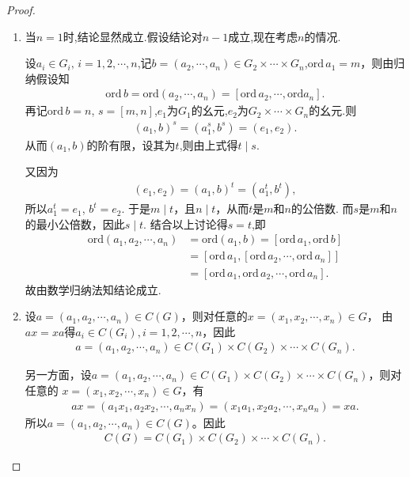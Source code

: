 \documentclass[../../main.tex]{subfiles}%
\begin{document}
\begin{proof}
\begin{enumerate}[(1)]
\item 当$n=1$时,结论显然成立.假设结论对$n-1$成立,现在考虑$n$的情况.

设$a_i\in G_i,\,i=1,2,\cdots,n$,记$b=(a_2,\cdots,a_n)\in G_2\times \cdots\times G_n$,$\mathrm{ord}\,a_1 = m$，则由归纳假设知
\begin{align*}
\mathrm{ord}\,b=\mathrm{ord}(a_2,\cdots ,a_n)=\left[ \mathrm{ord}\,a_2,\cdots ,\mathrm{ord}a_n \right] .
\end{align*}
再记$\mathrm{ord}\,b = n$, $s = [m,n]$,$e_1$为$G_1$的幺元,$e_2$为$G_2\times \cdots\times G_n$的幺元.则
\begin{align*}
(a_1,b)^s = (a_1^s, b^s) = (e_1, e_2). 
\end{align*}
从而$(a_1,b)$的阶有限，设其为$t$,则由上式得$t \mid s$.

又因为
\begin{align*}
(e_1,e_2) = (a_1,b)^t = (a_1^t, b^t),
\end{align*}
所以$a_1^t = e_1$, $b^t = e_2$. 于是$m \mid t$，且$n \mid t$，从而$t$是$m$和$n$的公倍数. 而$s$是$m$和$n$的最小公倍数，因此$s \mid t$. 结合以上讨论得$s = t$,即
\begin{align*}
\mathrm{ord}\left( a_1,a_2,\cdots ,a_n \right) &=\mathrm{ord}\left( a_1,b \right) =\left[ \mathrm{ord}\,a_1,\mathrm{ord}\,b \right] 
\\
&=\left[ \mathrm{ord}\,a_1,\left[ \mathrm{ord}\,a_2,\cdots ,\mathrm{ord}\,a_n \right] \right] 
\\
&=\left[ \mathrm{ord}\,a_1,\mathrm{ord}\,a_2,\cdots ,\mathrm{ord}\,a_n \right] .
\end{align*}
故由数学归纳法知结论成立.

\item 设$a = (a_1,a_2,\cdots,a_n) \in C(G)$，则对任意的$x = (x_1,x_2,\cdots,x_n) \in G$，
由$ax = xa$得$a_i \in C(G_i),i = 1,2,\cdots,n$，因此
\begin{align*}
a = (a_1,a_2,\cdots,a_n) \in C(G_1) \times C(G_2) \times \cdots \times C(G_n).
\end{align*}

另一方面，设$a = (a_1,a_2,\cdots,a_n) \in C(G_1) \times C(G_2) \times \cdots \times C(G_n)$，则对任意的
$x = (x_1,x_2,\cdots,x_n) \in G$，有
\begin{align*}
ax = (a_1x_1,a_2x_2,\cdots,a_nx_n) 
= (x_1a_1,x_2a_2,\cdots,x_na_n) = xa.
\end{align*}
所以$a = (a_1,a_2,\cdots,a_n) \in C(G)$。因此
\begin{align*}
C(G) = C(G_1) \times C(G_2) \times \cdots \times C(G_n).
\end{align*}


\end{enumerate}
\end{proof}
\end{document}
